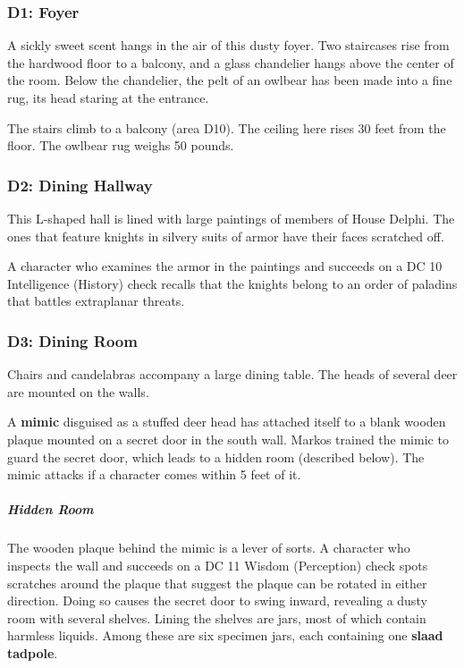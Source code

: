 \documentclass[10pt,a4paper,twoside,bg=print,twocolumn,openany,nodeprecatedcode]{dndbook}
\begin{document}
\subsubsection{D1: Foyer}
\begin{DndReadAloud}{}
A sickly sweet scent hangs in the air of this dusty foyer. Two staircases rise from the hardwood floor to a balcony, and a glass chandelier hangs above the center of the room. Below the chandelier, the pelt of an owlbear has been made into a fine rug, its head staring at the entrance.

\end{DndReadAloud}

The stairs climb to a balcony (area D10). The ceiling here rises 30 feet from the floor. The owlbear rug weighs 50 pounds.

\subsubsection{D2: Dining Hallway}
\begin{DndReadAloud}{}
This L-shaped hall is lined with large paintings of members of House Delphi. The ones that feature knights in silvery suits of armor have their faces scratched off.

\end{DndReadAloud}

A character who examines the armor in the paintings and succeeds on a DC 10 Intelligence (History) check recalls that the knights belong to an order of paladins that battles extraplanar threats.

\subsubsection{D3: Dining Room}
\begin{DndReadAloud}{}
Chairs and candelabras accompany a large dining table. The heads of several deer are mounted on the walls.

\end{DndReadAloud}

A \textbf{mimic} disguised as a stuffed deer head has attached itself to a blank wooden plaque mounted on a secret door in the south wall. Markos trained the mimic to guard the secret door, which leads to a hidden room (described below). The mimic attacks if a character comes within 5 feet of it.

\subparagraph{Hidden Room}
The wooden plaque behind the mimic is a lever of sorts. A character who inspects the wall and succeeds on a DC 11 Wisdom (Perception) check spots scratches around the plaque that suggest the plaque can be rotated in either direction. Doing so causes the secret door to swing inward, revealing a dusty room with several shelves. Lining the shelves are jars, most of which contain harmless liquids. Among these are six specimen jars, each containing one \textbf{slaad tadpole}.
\end{document}
